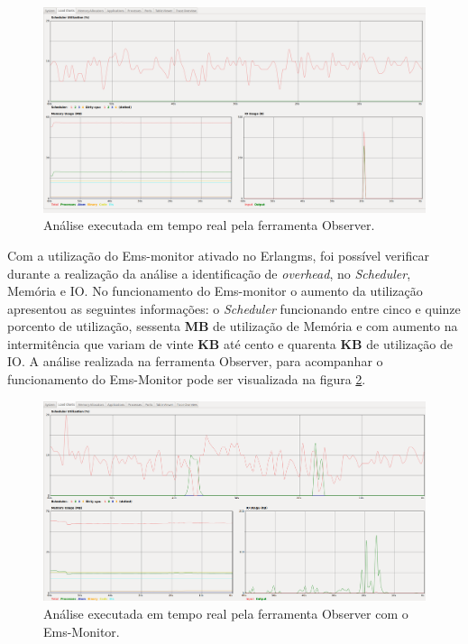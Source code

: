 \begin{figure}[H]
    \centering
    \includegraphics[scale = 0.33]{img/Observer_ErlangMS_sem_SNMP.png}
    \caption{Análise executada em tempo real pela ferramenta Observer.}
    \label{fun:fig:Observer_ErlangMS_sem_SNMP}
\end{figure}

Com a utilização do Ems-monitor ativado no Erlangms, foi possível verificar durante a realização da análise a identificação de \textit{overhead}, no \textit{Scheduler}, Memória e IO. No funcionamento do Ems-monitor o aumento da utilização apresentou as seguintes informações:  o \textit{Scheduler} funcionando entre cinco e quinze porcento de utilização, sessenta \textbf{MB} de utilização de Memória e com aumento na intermitência que variam de vinte \textbf{KB} até cento e quarenta \textbf{KB} de utilização de IO. A análise realizada na ferramenta Observer, para acompanhar o funcionamento do Ems-Monitor pode ser visualizada na figura \ref{fun:fig:Observer_ErlangMS_com_SNMP}.  

\begin{figure}[H]
    \centering
    \includegraphics[scale = 0.33]{img/Observer_ErlangMS_com_SNMP.png}
    \caption{Análise executada em tempo real pela ferramenta Observer com o Ems-Monitor.}
    \label{fun:fig:Observer_ErlangMS_com_SNMP}
\end{figure}

